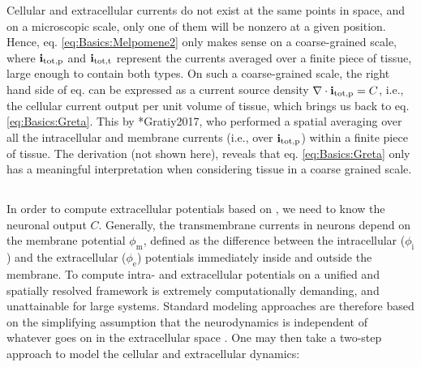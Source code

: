 Cellular  and extracellular currents do not exist at the same points in space, and on a microscopic scale,  only one of them will be nonzero at a given position. Hence, eq. \ref{eq:Basics:Melpomene2} only makes sense on a coarse-grained scale, where ${\bf i}_\text{tot,p}$ and ${\bf i}_\text{tot,t}$ represent the currents averaged over a finite piece of tissue, large enough to contain both types. On such a coarse-grained scale, the right hand side of eq. \label{eq:Basics:Melpomene2} can be expressed as a current source density ${\bf \nabla} \cdot {\bf i}_\text{tot,p} = C$, i.e., the cellular current output per unit volume of tissue, which brings us back to eq. \ref{eq:Basics:Greta}. This  by \citeasnoun**{Gratiy2017}, who performed a spatial averaging over all the intracellular and membrane currents (i.e., over ${\bf i}_\text{tot,p}$) within a finite piece of tissue. The derivation (not shown here), reveals that eq. \ref{eq:Basics:Greta} only has a meaningful interpretation when considering tissue in a coarse grained scale.



\subsection{}
\label{sec:Basics:twostep}
In order to compute extracellular potentials based on , we need to know the neuronal output $C$. Generally, the transmembrane currents in neurons depend on the membrane potential $\phi_\text{m}$, defined as the difference between the intracellular ($\phi_\text{i}$) and the extracellular ($\phi_\text{e}$) potentials immediately inside and outside the membrane.
To compute intra- and extracellular potentials on a unified and spatially resolved framework
is extremely computationally demanding, and unattainable for large systems. Standard modeling approaches are therefore based on the simplifying assumption that the neurodynamics is independent of whatever goes on in the extracellular space .
One may then take a two-step approach to model the cellular and extracellular dynamics:

